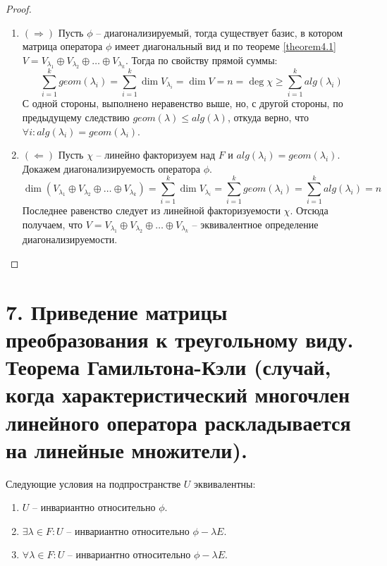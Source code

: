 \begin{proof}~
    \begin{enumerate}
        \item $(\Rightarrow)$ Пусть $\phi$ -- диагонализируемый, тогда существует базис, в котором матрица оператора $\phi$ 
        имеет диагональный вид и по теореме \ref{theorem4.1} 
        $V = V_{\lambda_1} \oplus V_{\lambda_2} \oplus \dots \oplus V_{\lambda_k}$. 
        Тогда по свойству прямой суммы: 
        $$\sum_{i=1}^k geom(\lambda_i) = \sum_{i=1}^k \dim V_{\lambda_i} = 
        \dim V = n = \deg \chi \geq \sum_{i=1}^k alg(\lambda_i)$$
        С одной стороны, выполнено неравенство выше, но, с другой стороны, по предыдущему следствию 
        $geom(\lambda) \leq alg(\lambda)$, откуда верно, что $\forall i: alg(\lambda_i) = geom(\lambda_i)$.
        \item $(\Leftarrow)$ Пусть $\chi$ -- линейно факторизуем над $F$ и $alg(\lambda_i) = geom(\lambda_i)$. 
        Докажем диагонализируемость оператора $\phi$.
        $$\dim(V_{\lambda_1} \oplus V_{\lambda_2} \oplus \dots \oplus V_{\lambda_k}) = 
        \sum_{i=1}^k \dim V_{\lambda_i} = \sum_{i=1}^k geom(\lambda_i) = \sum_{i=1}^k alg(\lambda_i) = n$$
        Последнее равенство следует из линейной факторизуемости $\chi$. 
        Отсюда получаем, что $V = V_{\lambda_1} \oplus V_{\lambda_2} \oplus \dots \oplus V_{\lambda_k}$ -- 
        эквивалентное определение диагонализируемости.
    \end{enumerate}
\end{proof}

\section{7. Приведение матрицы преобразования к треугольному виду. Теорема Гамильтона-Кэли (случай, когда характеристический многочлен линейного оператора раскладывается на линейные множители).}

\begin{proposition}
    \label{prop4.2}
    Следующие условия на подпространстве $U$ эквивалентны:
    \begin{enumerate}
        \item $U$ -- инвариантно относительно $\phi$.
        \item $\exists \lambda \in F: U$ -- инвариантно относительно $\phi - \lambda E$.
        \item  $\forall \lambda \in F: U$ -- инвариантно относительно $\phi - \lambda E$.
    \end{enumerate}
\end{proposition}

